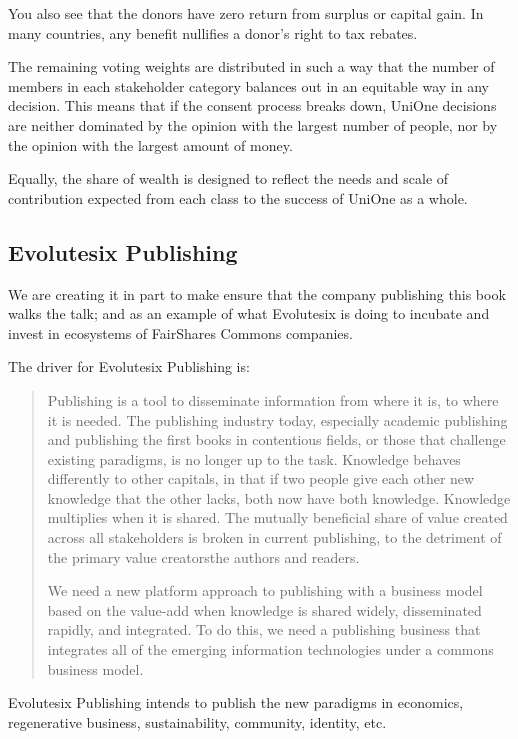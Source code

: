 You also see that the donors have zero return from surplus or capital gain. In many countries, any benefit nullifies a donor’s right to tax rebates.


The remaining voting weights are distributed in such a way that the number of members in each stakeholder category balances out in an equitable way in any decision. This means that if the consent process breaks down, UniOne decisions are neither dominated by the opinion with the largest number of people, nor by the opinion with the largest amount of money.


Equally, the share of wealth is designed to reflect the needs and scale of contribution expected from each class to the success of UniOne as a whole. 
\subsection{Evolutesix Publishing}
We are creating it in part to make ensure that the company publishing this book walks the talk; and as an example of what Evolutesix is doing to incubate and invest in ecosystems of FairShares Commons companies.


The driver for Evolutesix Publishing is:
\begin{quote}
Publishing is a tool to disseminate information from where it is, to where it is needed. The publishing industry today, especially academic publishing and publishing the first books in contentious fields, or those that challenge existing paradigms, is no longer up to the task. Knowledge behaves differently to other capitals, in that if two people give each other new knowledge that the other lacks, both now have both knowledge. Knowledge multiplies when it is shared. The mutually beneficial share of value created across all stakeholders is broken in current publishing, to the detriment of the primary value creators\textemdash the authors and readers.


\noindent We need a new platform approach to publishing with a business model based on the value-add when knowledge is shared widely, disseminated rapidly, and integrated. To do this, we need a publishing business that integrates all of the emerging information technologies under a commons business model.
\end{quote}


Evolutesix Publishing intends to publish the new paradigms in economics, regenerative business, sustainability, community, identity, etc. 


